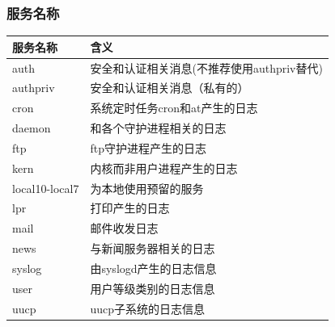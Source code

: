 \documentclass[xcolor=svgnames,presentation]{beamer}
\begin{document}
\begin{frame}
\frametitle{服务名称}
\label{sec-6-5}


\begin{center}
\begin{tabular}{ll}
 服务名称        &  含义                                        \\
\hline
 auth            &  安全和认证相关消息(不推荐使用authpriv替代)  \\
 authpriv        &  安全和认证相关消息（私有的）                \\
 cron            &  系统定时任务cron和at产生的日志              \\
 daemon          &  和各个守护进程相关的日志                    \\
 ftp             &  ftp守护进程产生的日志                       \\
 kern            &  内核而非用户进程产生的日志                  \\
 local10-local7  &  为本地使用预留的服务                        \\
 lpr             &  打印产生的日志                              \\
 mail            &  邮件收发日志                                \\
 news            &  与新闻服务器相关的日志                      \\
 syslog          &  由syslogd产生的日志信息                     \\
 user            &  用户等级类别的日志信息                      \\
 uucp            &  uucp子系统的日志信息                        \\
\end{tabular}
\end{center}
\end{frame}
\end{document}
